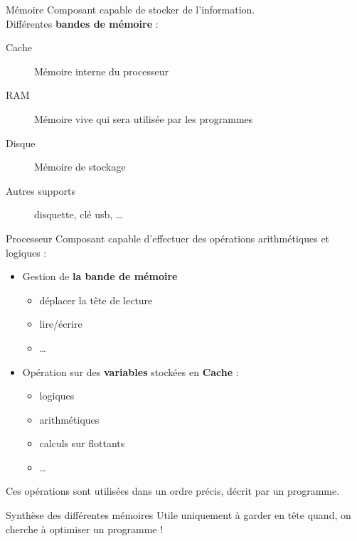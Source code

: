 \begin{frame}{Mémoire}
    Composant capable de stocker de l'information. \\
    \newline
    Différentes \textbf{bandes de mémoire} :
    \begin{description}
        \item[Cache] Mémoire interne du processeur
        \item[RAM] Mémoire vive qui sera utilisée par les programmes
        \item[Disque] Mémoire de stockage
        \item[Autres supports] disquette, clé usb, …
    \end{description}
\end{frame}

\begin{frame}{Processeur}
    Composant capable d'effectuer des opérations arithmétiques et logiques :
    \begin{itemize}
        \item Gestion de \textbf{la bande de mémoire}
        \begin{itemize}
            \item déplacer la tête de lecture
            \item lire/écrire
            \item …
        \end{itemize}
        \item Opération sur des \textbf{variables} stockées en \textbf{Cache} :
        \begin{itemize}
            \item logiques
            \item arithmétiques
            \item calculs sur flottants
            \item …
        \end{itemize}
    \end{itemize}
    Ces opérations sont utilisées dans un ordre précis, décrit par un programme.
\end{frame}

\begin{frame}{Synthèse des différentes mémoires}
    Utile uniquement à garder en tête quand, on cherche à optimiser un programme !
\end{frame}
